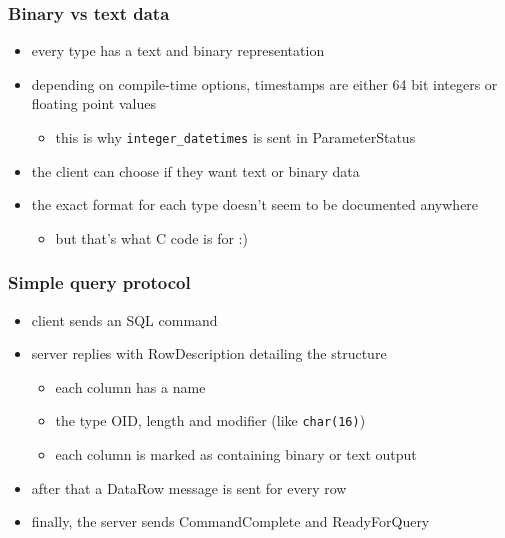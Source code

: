 \documentclass{beamer}
\begin{document}
\begin{frame}
  \frametitle{Binary vs text data}

  \begin{itemize}
  \item every type has a text and binary representation
  \item depending on \alert{compile-time options}, timestamps are either 64 bit
    integers or floating point values
    \begin{itemize}
    \item this is why \texttt{integer\_datetimes} is sent in ParameterStatus
    \end{itemize}
  \item the client can choose if they want text or binary data
  \item the exact format for each type doesn't seem to be documented anywhere
    \begin{itemize}
    \item but that's what C code is for :)
    \end{itemize}
  \end{itemize}
\end{frame}

\begin{frame}
  \frametitle{Simple query protocol}

  \begin{itemize}
  \item client sends an SQL command
  \item server replies with RowDescription detailing the structure
    \begin{itemize}
    \item each column has a name
    \item the type OID, length and modifier (like \texttt{char(16)})
    \item each column is marked as containing binary or text output
    \end{itemize}
  \item after that a DataRow message is sent for every row
  \item finally, the server sends CommandComplete and ReadyForQuery
  \end{itemize}
\end{frame}
\end{document}
